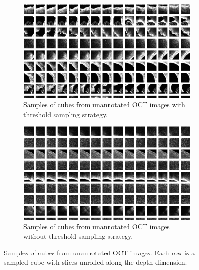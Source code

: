\documentclass[a4paper,11pt,oneside]{report}
\begin{document}
\begin{figure}[t]
    \centering
    \begin{subfigure}{0.48\textwidth}
        \centering
        \includegraphics[width=0.9\linewidth]{figures/fig_implementation_genesis_extracted_cube.png}
        \caption{Samples of cubes from unannotated OCT images with threshold sampling strategy.}
        \label{fig:genesis-cubes-with-threshold}

    \end{subfigure}%
    \hfill
    \begin{subfigure}{0.48\textwidth}
        \centering
        \includegraphics[width=0.9\linewidth]{figures/fig_implementation_genesis_extracted_cube_no_threshold.png}
        \caption{Samples of cubes from unannotated OCT images without threshold sampling strategy.}
        \label{fig:genesis-cubes-without-threshold}
    \end{subfigure}
    \caption{Samples of cubes from unannotated OCT images. Each row is a sampled cube with slices unrolled along the depth dimension.}
\end{figure}
\end{document}
